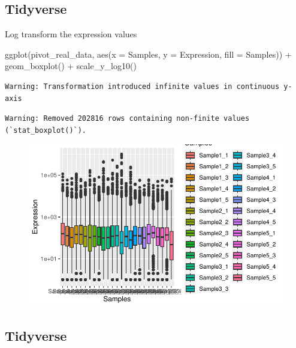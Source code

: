 \documentclass[
  letterpaper,
  DIV=11,
  numbers=noendperiod,
  landscape]{scrartcl}
\newenvironment{Shaded}{\begin{snugshade}}{\end{snugshade}}
\newcommand{\AttributeTok}[1]{\textcolor[rgb]{0.40,0.45,0.13}{#1}}
\newcommand{\FunctionTok}[1]{\textcolor[rgb]{0.28,0.35,0.67}{#1}}
\newcommand{\NormalTok}[1]{\textcolor[rgb]{0.00,0.23,0.31}{#1}}
\newcommand{\SpecialCharTok}[1]{\textcolor[rgb]{0.37,0.37,0.37}{#1}}
\begin{document}
\hypertarget{tidyverse-7}{%
\subsection{Tidyverse}\label{tidyverse-7}}

Log transform the expression values

\begin{Shaded}
\begin{Highlighting}[numbers=left,,]
\FunctionTok{ggplot}\NormalTok{(pivot\_real\_data, }\FunctionTok{aes}\NormalTok{(}\AttributeTok{x =}\NormalTok{ Samples, }\AttributeTok{y =}\NormalTok{ Expression, }\AttributeTok{fill =}\NormalTok{ Samples)) }\SpecialCharTok{+}
  \FunctionTok{geom\_boxplot}\NormalTok{() }\SpecialCharTok{+}
  \FunctionTok{scale\_y\_log10}\NormalTok{() }
\end{Highlighting}
\end{Shaded}

\begin{verbatim}
Warning: Transformation introduced infinite values in continuous y-axis
\end{verbatim}

\begin{verbatim}
Warning: Removed 202816 rows containing non-finite values (`stat_boxplot()`).
\end{verbatim}

\begin{figure}[H]

{\centering \includegraphics{RandRStudio_files/figure-pdf/unnamed-chunk-26-1.pdf}

}

\end{figure}

\hypertarget{tidyverse-8}{%
\subsection{Tidyverse}\label{tidyverse-8}}
\end{document}
